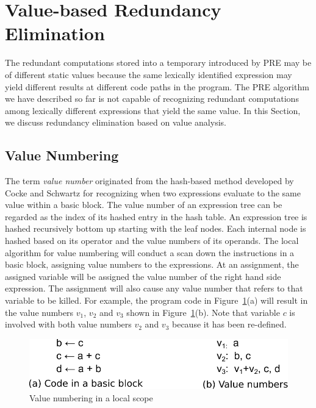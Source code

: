 \section{Value-based Redundancy Elimination}
\label{section:Part3:Pre_not_helped:SemanticPRE}

The redundant computations stored into a temporary introduced by PRE may
be of different static values because the same lexically identified expression 
may yield different results at different code paths in the program.
The PRE algorithm we have described so far is not capable
of recognizing redundant computations among lexically different expressions
that yield the same value.  In this Section, we discuss redundancy elimination
based on value analysis.

\subsection{Value Numbering}
\label{sec:pre_not_helped:GVN}
The term \emph{value number} originated from the 
hash-based method developed by Cocke and Schwartz for recognizing when two
expressions evaluate to the same value within a basic block.  
The value number of an expression tree can be regarded as the index of its
hashed entry in the hash table.  
An expression tree is hashed recursively bottom up starting with the leaf nodes.
Each internal node is hashed based on its operator and the value numbers of 
its operands.  The local algorithm for value numbering will conduct a scan
down the instructions in a basic block, assigning value numbers to the
expressions.  At an assignment, the assigned variable will be assigned
the value number of the right hand side expression.  The assignment will also
cause any value number that refers to that variable to be killed. For example,
the program code in Figure~\ref{fig: bb-value-num}(a) will result in the
value numbers $v_1$, $v_2$ and $v_3$ shown in Figure~\ref{fig: bb-value-num}(b).
Note that variable $c$ is involved with both value numbers $v_2$ and $v_3$
because it has been re-defined.

\begin{figure}[t]
\centering
\includegraphics[scale=0.55]{fig-bb-value-num.pdf}
\caption{Value numbering in a local scope}
\label{fig: bb-value-num}
\end{figure}

